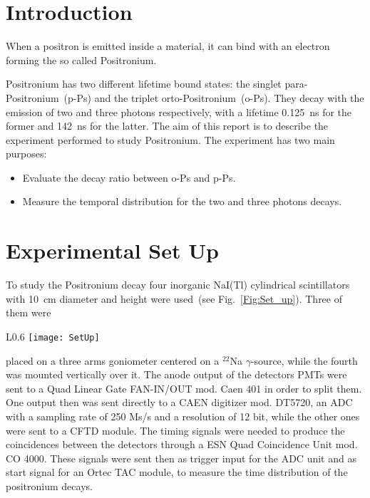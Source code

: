 \section*{Introduction}
When a positron is emitted inside a material, it can bind with an electron forming the so called Positronium. 

Positronium has two different lifetime bound states: the singlet para-Positronium~(p-Ps) and the triplet orto-Positronium~(o-Ps). They decay with the emission of two and three photons respectively, with a  lifetime 0.125~ns for the former and 142~ns for the latter. 
The aim of this report is to describe the experiment performed to study Positronium. The experiment has two main purposes:
\begin{itemize}
 \item Evaluate the decay ratio between o-Ps and p-Ps.
 \item Measure the temporal distribution for the two and three photons decays.
\end{itemize} 

\section*{Experimental Set Up}

To study the Positronium decay four inorganic NaI(Tl) cylindrical scintillators with 10~cm diameter and height were used~(see Fig.~\ref{Fig:Set_up}). Three of them were

\begin{wrapfigure}{L}{0.6\textwidth}
\centering
\texttt{[image: SetUp]}
\caption{Electronic setup for the study of positronium decay.}
\label{Fig:Set_up}
\end{wrapfigure}
placed on a three arms goniometer centered on a $^{22}$Na $\gamma$-source, while the fourth was mounted vertically over it. The anode output of the detectors PMTs  were sent to a Quad Linear Gate FAN-IN/OUT mod. Caen 401 in order to split them. One output then was sent directly to a CAEN digitizer mod. DT5720, an ADC with a sampling rate of 250 Ms/s and a resolution of 12 bit, while the other ones were sent to a  CFTD module. The timing signals were needed to produce the coincidences between the detectors through a ESN Quad Coincidence Unit mod. CO 4000. These signals were sent then as trigger input for the ADC unit and as start signal for an Ortec TAC module,  to measure the time distribution of the positronium decays.

